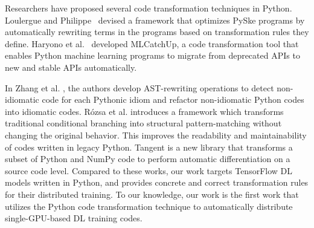 Researchers have proposed several code transformation techniques in Python.
Loulergue and Philippe~\cite{loulergue2019automatic} devised a framework that optimizes
PySke programs by automatically rewriting terms in the programs based on
transformation rules they define.
Haryono et al.~\cite{haryono2021mlcatchup} developed MLCatchUp, a code transformation tool
that enables Python machine learning programs to migrate from deprecated APIs
to new and stable APIs automatically. 
\begin{inred}
In Zhang et al. \cite{python-idiomatic}, the authors develop AST-rewriting 
operations to detect non-idiomatic code for each Pythonic idiom and refactor 
non-idiomatic Python codes into idiomatic codes.
Rózsa et al. \cite{dont-diy}  introduces a framework 
which transforms traditional conditional branching into structural pattern-matching 
without changing the original behavior. 
This improves the readability and maintainability of codes written in legacy Python.
Tangent \cite{tangent} is a new library that transforms a subset of Python and NumPy code 
to perform automatic differentiation on a source code level.
Compared to these works, our work targets TensorFlow DL models written in
Python, and provides concrete and correct transformation rules for their
distributed training.
To our knowledge, our work is the first work that utilizes the Python code transformation technique to 
automatically distribute single-GPU-based DL training codes.
\end{inred}

